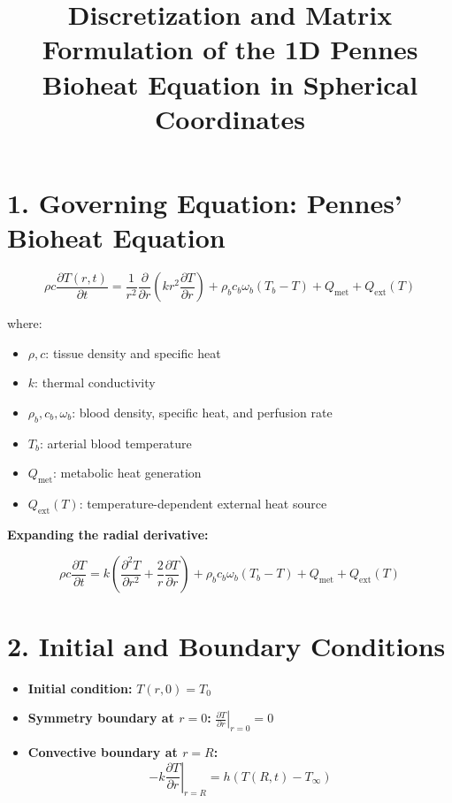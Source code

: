 \documentclass[12pt]{article}
\title{Discretization and Matrix Formulation of the 1D Pennes Bioheat Equation in Spherical Coordinates}
\author{}
\date{}
\begin{document}
\maketitle

\section*{1. Governing Equation: Pennes' Bioheat Equation}

\begin{equation}
\rho c \frac{\partial T(r,t)}{\partial t} = \frac{1}{r^2} \frac{\partial}{\partial r} \left( k r^2 \frac{\partial T}{\partial r} \right) + \rho_b c_b \omega_b (T_b - T) + Q_{\text{met}} + Q_{\text{ext}}(T)
\end{equation}

\noindent where:
\begin{itemize}
    \item \( \rho, c \): tissue density and specific heat
    \item \( k \): thermal conductivity
    \item \( \rho_b, c_b, \omega_b \): blood density, specific heat, and perfusion rate
    \item \( T_b \): arterial blood temperature
    \item \( Q_{\text{met}} \): metabolic heat generation
    \item \( Q_{\text{ext}}(T) \): temperature-dependent external heat source
\end{itemize}

\textbf{Expanding the radial derivative:}

\begin{equation}
\rho c \frac{\partial T}{\partial t} = 
k \left( \frac{\partial^2 T}{\partial r^2} + \frac{2}{r} \frac{\partial T}{\partial r} \right)
+ \rho_b c_b \omega_b (T_b - T)
+ Q_{\text{met}} + Q_{\text{ext}}(T)
\end{equation}

\section*{2. Initial and Boundary Conditions}

\begin{itemize}
    \item \textbf{Initial condition:} \( T(r, 0) = T_0 \)
    \item \textbf{Symmetry boundary at \( r = 0 \):} \( \left. \frac{\partial T}{\partial r} \right|_{r=0} = 0 \)
    \item \textbf{Convective boundary at \( r = R \):} 
    \[
    -k \left. \frac{\partial T}{\partial r} \right|_{r=R} = h (T(R,t) - T_\infty)
    \]
\end{itemize}
\end{document}
